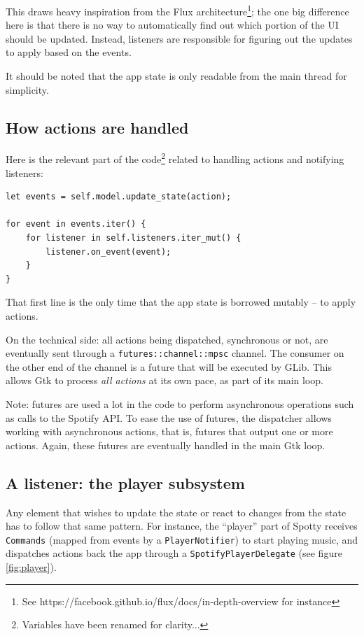\documentclass[12pt, a4paper]{article}
\begin{document}
This draws heavy inspiration from the Flux architecture\footnote{See https://facebook.github.io/flux/docs/in-depth-overview for instance}; the one big difference here is that there is no way to automatically find out which portion of the UI should be updated. Instead, listeners are responsible for figuring out the updates to apply based on the events.

It should be noted that the app state is only readable from the main thread for simplicity.

\subsection{How actions are handled}

Here is the relevant part of the code\footnote{Variables have been renamed for clarity...} related to handling actions and notifying listeners:

\begin{verbatim}
let events = self.model.update_state(action);

for event in events.iter() {
    for listener in self.listeners.iter_mut() {
        listener.on_event(event);
    }
}
\end{verbatim}

That first line is the only time that the app state is borrowed mutably -- to apply actions.

On the technical side: all actions being dispatched, synchronous or not, are eventually sent through a \texttt{futures::channel::mpsc} channel. The consumer on the other end of the channel is a future that will be executed by GLib. This allows Gtk to process \emph{all actions} at its own pace, as part of its main loop.

Note: futures are used a lot in the code to perform asynchronous operations such as calls to the Spotify API. To ease the use of futures, the dispatcher allows working with asynchronous actions, that is, futures that output one or more actions. Again, these futures are eventually handled in the main Gtk loop.

\subsection{A listener: the player subsystem}

Any element that wishes to update the state or react to changes from the state has to follow that same pattern. For instance, the ``player'' part of Spotty receives \texttt{Commands} (mapped from events by a \texttt{PlayerNotifier}) to start playing music, and dispatches actions back the app through a \texttt{SpotifyPlayerDelegate} (see figure \ref{fig:player}).
\end{document}
